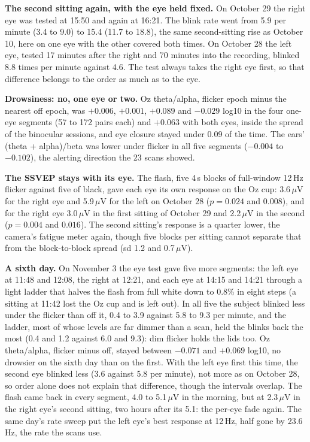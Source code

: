 \documentclass[conference]{IEEEtran}
\begin{document}
\textbf{The second sitting again, with the eye held fixed.} On October 29 the right eye was tested at 15:50 and again at 16:21. The blink rate went from 5.9 per minute (3.4 to 9.0) to 15.4 (11.7 to 18.8), the same second-sitting rise as October 10, here on one eye with the other covered both times. On October 28 the left eye, tested 17 minutes after the right and 70 minutes into the recording, blinked 8.8 times per minute against 4.6. The test always takes the right eye first, so that difference belongs to the order as much as to the eye.

\textbf{Drowsiness: no, one eye or two.} Oz theta/alpha, flicker epoch minus the nearest off epoch, was $+0.006$, $+0.001$, $+0.089$ and $-0.029$ log10 in the four one-eye segments (57 to 172 pairs each) and $+0.063$ with both eyes, inside the spread of the binocular sessions, and eye closure stayed under 0.09 of the time. The ears' (theta + alpha)/beta was lower under flicker in all five segments ($-0.004$ to $-0.102$), the alerting direction the 23 scans showed.

\textbf{The SSVEP stays with its eye.} The flash, five 4\,s blocks of full-window 12\,Hz flicker against five of black, gave each eye its own response on the Oz cup: 3.6\,$\mu$V for the right eye and 5.9\,$\mu$V for the left on October 28 ($p = 0.024$ and $0.008$), and for the right eye 3.0\,$\mu$V in the first sitting of October 29 and 2.2\,$\mu$V in the second ($p = 0.004$ and $0.016$). The second sitting's response is a quarter lower, the camera's fatigue meter again, though five blocks per sitting cannot separate that from the block-to-block spread (sd 1.2 and 0.7\,$\mu$V).

\textbf{A sixth day.} On November 3 the eye test gave five more segments: the left eye at 11:48 and 12:08, the right at 12:21, and each eye at 14:15 and 14:21 through a light ladder that halves the flash from full white down to 0.8\% in eight steps (a sitting at 11:42 lost the Oz cup and is left out). In all five the subject blinked less under the flicker than off it, 0.4 to 3.9 against 5.8 to 9.3 per minute, and the ladder, most of whose levels are far dimmer than a scan, held the blinks back the most (0.4 and 1.2 against 6.0 and 9.3): dim flicker holds the lids too. Oz theta/alpha, flicker minus off, stayed between $-0.071$ and $+0.069$ log10, no drowsier on the sixth day than on the first. With the left eye first this time, the second eye blinked less (3.6 against 5.8 per minute), not more as on October 28, so order alone does not explain that difference, though the intervals overlap. The flash came back in every segment, 4.0 to 5.1\,$\mu$V in the morning, but at 2.3\,$\mu$V in the right eye's second sitting, two hours after its 5.1: the per-eye fade again. The same day's rate sweep put the left eye's best response at 12\,Hz, half gone by 23.6\,Hz, the rate the scans use.
\end{document}
